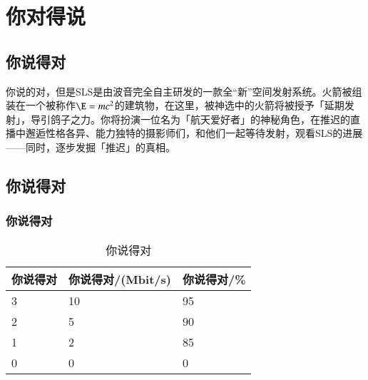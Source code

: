 
\iffalse
\fi


\chapter{你对得说}

\section{你说得对}
你说的对，但是SLS是由波音完全自主研发的一款全“新”空间发射系统。火箭被组装在一个被称作$\E=mc^2$的建筑物，在这里，被神选中的火箭将被授予「延期发射」，导引鸽子之力。你将扮演一位名为「航天爱好者」的神秘角色，在推迟的直播中邂逅性格各异、能力独特的摄影师们，和他们一起等待发射，观看SLS的进展——同时，逐步发掘「推迟」的真相。

\section{你说得对}
\subsection{你说得对}

\begin{table}[!ht]
	\centering
	\caption{你说得对}
	\label{config1-1}
	\begin{tabular}{lll}\hline
		\textbf{你说得对} & \textbf{你说得对/(Mbit/s)} & \textbf{你说得对/\%} \\ \hline
		
		3 & 10 & 95 \\ 
		2 & 5 & 90 \\ 
		1 & 2 & 85 \\ 
		0 & 0 & 0 \\ \hline
	\end{tabular}
	
\end{table}	


